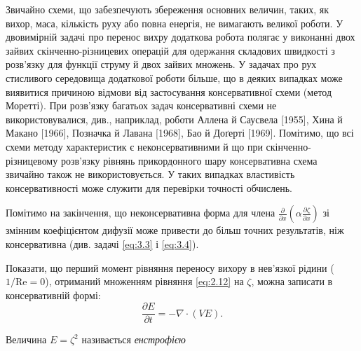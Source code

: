 Звичайно схеми, що забезпечують збереження основних величин, таких, як вихор, маса, кількість руху або повна енергія, не вимагають великої роботи. У двовимірній задачі про перенос вихру додаткова робота полягає у виконанні двох зайвих скінченно-різницевих операцій для одержання складових швидкості з розв'язку для функції струму й двох зайвих множень. У задачах про рух стисливого середовища додаткової роботи більше, що в деяких випадках може виявитися причиною відмови від застосування консервативної схеми (метод Моретті). При розв'язку багатьох задач консервативні схеми не використовувалися, див., наприклад, роботи Аллена й Саусвела [1955], Хина й Макано [1966], Позначка й Лавана [1968], Бао й Доґерті [1969]. Помітимо, що всі схеми методу характеристик є неконсервативними й що при скінченно-різницевому розв'язку рівнянь прикордонного шару консервативна схема звичайно також не використовується. У таких випадках властивість консервативності може служити для перевірки точності обчислень. \medskip

Помітимо на закінчення, що неконсервативна форма для члена $\frac{\partial}{\partial x} \left( \alpha \frac{\partial \zeta}{\partial x} \right)$ зі змінним коефіцієнтом дифузії може привести до більш точних результатів, ніж консервативна (див. задачі \eqref{eq:3.3} і \eqref{eq:3.4}).

\begin{exercise}
    Показати, що перший момент рівняння переносу вихору в нев'язкої рідини ($1 / \text{Re} = 0$), отриманий множенням рівняння \eqref{eq:2.12} на $\zeta$, можна записати в консервативній формі:
    \begin{equation*}
        \frac{\partial E}{\partial t} = - \nabla \cdot (V E).
    \end{equation*}
\end{exercise}
\begin{definition}
    Величина $E = \zeta^2$ називається \textit{енстрофією}
\end{definition}
